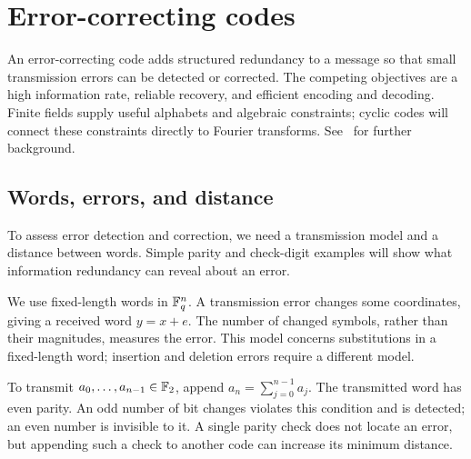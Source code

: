 \section{Error-correcting codes}
\label{sect1-applications-correctors-codes}
An error-correcting code adds structured redundancy to a message so that
small transmission errors can be detected or corrected. The competing
objectives are a high information rate, reliable recovery, and efficient
encoding and decoding. Finite fields supply useful alphabets and algebraic
constraints; cyclic codes will connect these constraints directly to
Fourier transforms. See~\cite{papini,demazure} for further background.

\subsection{Words, errors, and distance}

To assess error detection and correction, we need a transmission model and a
distance between words. Simple parity and check-digit examples will show
what information redundancy can reveal about an error.

We use fixed-length words in $\mathbb{F}_q^n$. A transmission error changes some
coordinates, giving a received word $y=x+e$. The number of changed symbols,
rather than their magnitudes, measures the error. This model concerns
substitutions in a fixed-length word; insertion and deletion errors require
a different model.


\begin{exmp}
\label{exmp-bit-parite}
To transmit $a_0,\ldots,a_{n-1}\in\mathbb{F}_2$, append
$a_n=\sum_{j=0}^{n-1}a_j$. The transmitted word has even parity.
An odd number of bit changes violates this condition and is detected;
an even number is invisible to it. A single parity check does not locate
an error, but appending such a check to another code can increase its
minimum distance.
\end{exmp}



